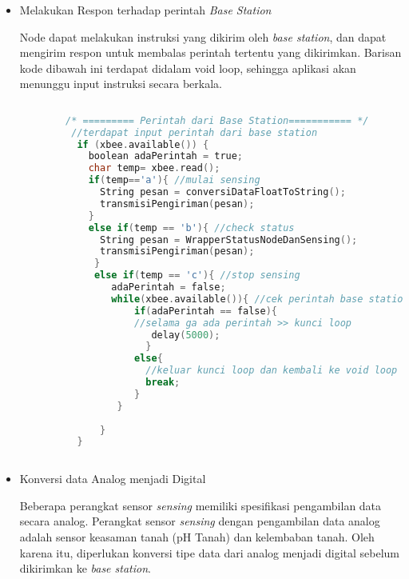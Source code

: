 \begin{itemize}
\begin{itemize}
            
        \end{itemize}
        
        \item Melakukan Respon terhadap perintah \textit{Base Station}
        
        Node dapat melakukan instruksi yang dikirim oleh \textit{base station}, dan dapat mengirim respon untuk membalas perintah tertentu yang dikirimkan. Barisan kode dibawah ini terdapat didalam void loop, sehingga aplikasi akan menunggu input instruksi secara berkala.
        
        \begin{lstlisting}[label=transmisiPengiriman, language=C, caption=Respon Perintah Base Station, numbers=none]
        
        /* ========= Perintah dari Base Station=========== */
         //terdapat input perintah dari base station
          if (xbee.available()) { 
            boolean adaPerintah = true;
            char temp= xbee.read();
            if(temp=='a'){ //mulai sensing
              String pesan = conversiDataFloatToString();
              transmisiPengiriman(pesan);
            }
            else if(temp == 'b'){ //check status
              String pesan = WrapperStatusNodeDanSensing();
              transmisiPengiriman(pesan);
             }
             else if(temp == 'c'){ //stop sensing
                adaPerintah = false;
                while(xbee.available()){ //cek perintah base station
                    if(adaPerintah == false){ 
                    //selama ga ada perintah >> kunci loop
                       delay(5000);
                      }
                    else{
                      //keluar kunci loop dan kembali ke void loop
                      break; 
                    }
                 } 
                
              }
          }
        
        \end{lstlisting}
        
        
        \item Konversi data Analog menjadi Digital
        
        Beberapa perangkat sensor \textit{sensing} memiliki spesifikasi pengambilan data secara analog. Perangkat sensor \textit{sensing} dengan pengambilan data analog adalah sensor keasaman tanah (pH Tanah) dan kelembaban tanah. Oleh karena itu, diperlukan konversi tipe data dari analog menjadi digital sebelum dikirimkan ke \textit{base station}.
        

\end{itemize}
